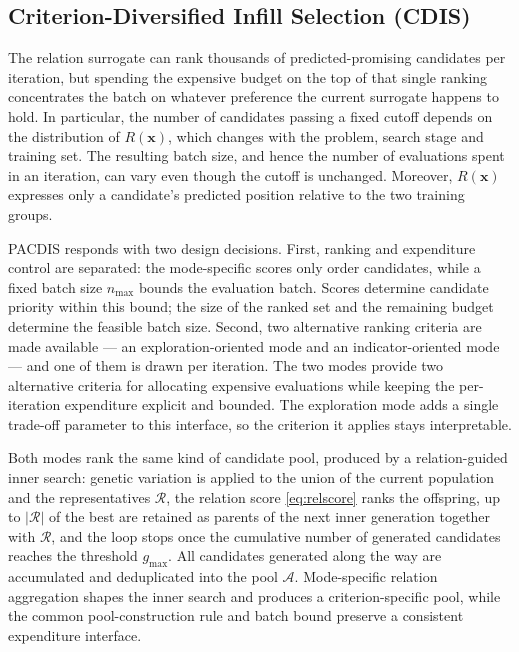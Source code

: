 \documentclass[final,5p,times,twocolumn]{elsarticle}
\newcommand{\vx}{\mathbf{x}}
\begin{document}
\subsection{Criterion-Diversified Infill Selection (CDIS)}
\label{sec:method:cdis}

The relation surrogate can rank thousands of predicted-promising candidates per
iteration, but spending the expensive budget on the top of that single ranking
concentrates the batch on whatever preference the current surrogate happens to
hold. In particular, the number of candidates passing a fixed cutoff depends on
the distribution of $R(\vx)$, which changes with the problem, search stage and
training set. The resulting batch size, and hence the number of evaluations
spent in an iteration, can vary even though the cutoff is unchanged.
Moreover, $R(\vx)$ expresses only a
candidate's predicted position relative to the two training groups.

PACDIS responds with two design decisions. First, ranking and expenditure
control are separated: the mode-specific scores only order candidates, while a
fixed batch size $n_{\max}$ bounds the evaluation batch. Scores determine
candidate priority within this bound; the size of the ranked set and the
remaining budget determine the feasible batch size. Second, two alternative
ranking criteria are made available --- an exploration-oriented mode and an
indicator-oriented mode --- and one of them is drawn per iteration. The two
modes provide two alternative criteria for allocating expensive evaluations
while keeping the per-iteration expenditure explicit and bounded. The
exploration mode adds a single trade-off parameter to this interface, so the
criterion it applies stays interpretable.

Both modes rank the same kind of candidate pool, produced by a relation-guided
inner search: genetic variation is applied to the union of the current
population and the representatives $\mathcal{R}$, the relation score
\eqref{eq:relscore} ranks the offspring, up to $|\mathcal{R}|$ of the best are retained as
parents of the next inner generation together with $\mathcal{R}$, and the loop
stops once the cumulative number of generated candidates reaches the threshold
$g_{\max}$. All candidates generated along the way are accumulated and
deduplicated into the pool $\mathcal{A}$. Mode-specific relation aggregation
shapes the inner search and produces a criterion-specific pool, while the common
pool-construction rule and batch bound preserve a consistent expenditure
interface.
\end{document}
